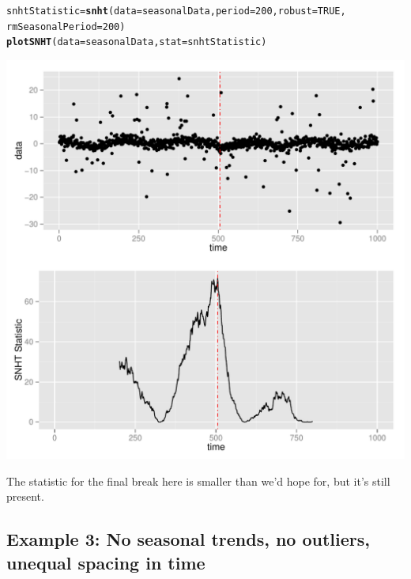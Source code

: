 \documentclass[nojss]{jss}\usepackage[]{graphicx}\usepackage[]{color}
\makeatletter
\def\maxwidth{ %
  \ifdim\Gin@nat@width>\linewidth
    \linewidth
  \else
    \Gin@nat@width
  \fi
}
\newcommand{\hlnum}[1]{\textcolor[rgb]{0.686,0.059,0.569}{#1}}%
\newcommand{\hlstd}[1]{\textcolor[rgb]{0.345,0.345,0.345}{#1}}%
\newcommand{\hlkwb}[1]{\textcolor[rgb]{0.69,0.353,0.396}{#1}}%
\newcommand{\hlkwc}[1]{\textcolor[rgb]{0.333,0.667,0.333}{#1}}%
\newcommand{\hlkwd}[1]{\textcolor[rgb]{0.737,0.353,0.396}{\textbf{#1}}}%
\newenvironment{kframe}{%
 \def\at@end@of@kframe{}%
 \ifinner\ifhmode%
  \def\at@end@of@kframe{\end{minipage}}%
  \begin{minipage}{\columnwidth}%
 \fi\fi%
 \def\FrameCommand##1{\hskip\@totalleftmargin \hskip-\fboxsep
 \colorbox{shadecolor}{##1}\hskip-\fboxsep
     \hskip-\linewidth \hskip-\@totalleftmargin \hskip\columnwidth}%
 \MakeFramed {\advance\hsize-\width
   \@totalleftmargin\z@ \linewidth\hsize
   \@setminipage}}%
 {\par\unskip\endMakeFramed%
 \at@end@of@kframe}
\newenvironment{knitrout}{}{} %
\makeatother
\begin{document}
\begin{knitrout}
\color{fgcolor}\begin{kframe}
\begin{alltt}
\hlstd{snhtStatistic} \hlkwb{=} \hlkwd{snht}\hlstd{(}\hlkwc{data} \hlstd{= seasonalData,} \hlkwc{period} \hlstd{=} \hlnum{200}\hlstd{,} \hlkwc{robust} \hlstd{=} \hlnum{TRUE}\hlstd{,}
                     \hlkwc{rmSeasonalPeriod} \hlstd{=} \hlnum{200}\hlstd{)}
\hlkwd{plotSNHT}\hlstd{(}\hlkwc{data} \hlstd{= seasonalData,} \hlkwc{stat} \hlstd{= snhtStatistic)}
\end{alltt}
\end{kframe}

{\centering \includegraphics[width=\maxwidth]{figure/unnamed-chunk-9-1} 

}



\end{knitrout}

The statistic for the final break here is smaller than we'd hope for, but it's still present.

\subsection{Example 3: No seasonal trends, no outliers, unequal spacing in time}
\end{document}
